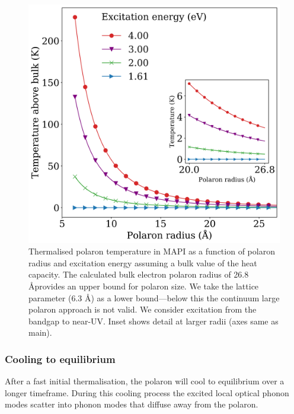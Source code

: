 \begin{figure}[h]
\centering
  \includegraphics[width=1\textwidth]{figures/ch5/f3.png}
  \caption[Polaron temperature as a function of polaron radius]{Thermalised polaron temperature in MAPI as a function of polaron
    radius and excitation  energy assuming a bulk value of the heat capacity. 
    The calculated bulk electron polaron radius
    of 26.8 \AA provides an upper bound for polaron size.
    We take the lattice parameter (6.3 \AA) as a lower bound---below this the
    continuum large polaron approach is not valid. 
    We consider excitation from the bandgap to near-UV. 
    Inset shows detail at larger radii (axes same as main). }
  \label{ch5TemperatureRadius}
\end{figure}


\subsubsection{Cooling to equilibrium}
After a fast initial thermalisation, the polaron will cool to equilibrium over a longer timeframe. During this cooling process the excited local optical phonon modes scatter into phonon modes that diffuse away from the polaron.

